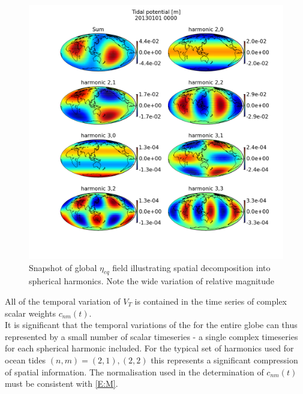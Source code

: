 \begin{figure}[h]
\begin{center}
\includegraphics[width=\figwidthBig]{figures/maps/tidal_potential_spatial_20130101_0000.png}
\caption{Snapshot of global $\eta_{eq}$ field illustrating spatial decomposition into spherical harmonics.  Note the wide variation of relative magnitude}
\label{fig:VT_EG}
\end{center}
\end{figure}


All of the temporal variation of $V_T$ is contained in the time series of complex scalar weights $c_{nm}(t)$.\\
It is significant that the temporal variations of the \ATGP{} for the entire globe can thus represented by a small number of scalar timeseries - a single complex timeseries for each spherical harmonic included.  For the typical set of harmonics used for ocean tides $(n,m)=(2,1),(2,2)$ this represents a significant compression of spatial information.  The normalisation used in the determination of $c_{nm}(t)$ must be consistent with \ref{E:M}.\\

